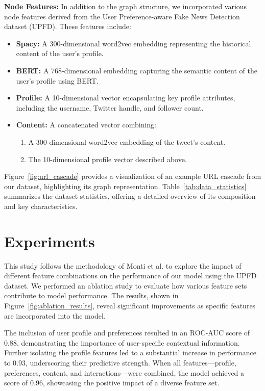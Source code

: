 \documentclass[sigconf,nonacm]{acmart}
\begin{document}
\textbf{Node Features:} In addition to the graph structure, we incorporated various node features derived from the User Preference-aware Fake News Detection dataset (UPFD). These features include:
\begin{itemize}
    \item \textbf{Spacy:} A 300-dimensional word2vec embedding representing the historical content of the user's profile.
    \item \textbf{BERT:} A 768-dimensional embedding capturing the semantic content of the user’s profile using BERT.
    \item \textbf{Profile:} A 10-dimensional vector encapsulating key profile attributes, including the username, Twitter handle, and follower count.
    \item \textbf{Content:} A concatenated vector combining:
    \begin{enumerate}
        \item A 300-dimensional word2vec embedding of the tweet's content.
        \item The 10-dimensional profile vector described above.
    \end{enumerate}
\end{itemize}

Figure~\ref{fig:url_cascade} provides a visualization of an example URL cascade from our dataset, highlighting its graph representation. Table~\ref{tab:data_statistics} summarizes the dataset statistics, offering a detailed overview of its composition and key characteristics.



\section{Experiments}


This study follows the methodology of Monti et al. to explore the impact of different feature combinations on the performance of our model using the UPFD dataset. We performed an ablation study to evaluate how various feature sets contribute to model performance. The results, shown in Figure~\ref{fig:ablation_results}, reveal significant improvements as specific features are incorporated into the model.

The inclusion of user profile and preferences resulted in an ROC-AUC score of 0.88, demonstrating the importance of user-specific contextual information. Further isolating the profile features led to a substantial increase in performance to 0.93, underscoring their predictive strength. When all features—profile, preferences, content, and interactions—were combined, the model achieved a score of 0.96, showcasing the positive impact of a diverse feature set.
\end{document}
